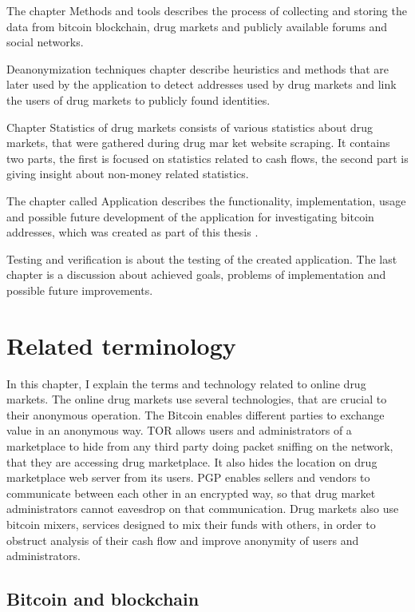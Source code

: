 \documentclass[
  digital, %
  table,   %
  lof,     %
  lot,     %
  oneside
]{fithesis3}
\begin{document}
The chapter Methods and tools describes the process of collecting and storing the data from bitcoin blockchain,
drug markets and publicly available forums and social networks. 

Deanonymization techniques chapter describe heuristics and methods that are later used by the application to detect 
addresses used by drug markets and link the users of drug markets to publicly found identities.

Chapter Statistics of drug markets consists of various statistics about drug markets, that were gathered during drug mar
ket website scraping.
It contains two parts, the first is focused on statistics related to cash flows, the second part is giving insight about
 non-money related statistics.

The chapter called Application describes the functionality, implementation, usage and 
possible future development of the application for investigating bitcoin addresses, which was created as part of this thesis
.

Testing and verification is about the testing of the created application.
The last chapter is a discussion about achieved goals, problems of implementation and possible future improvements.

\chapter{Related terminology}

In this chapter, I explain the terms and technology related to online drug markets.
The online drug markets use several technologies, that are crucial to their anonymous operation.
The Bitcoin enables different parties to exchange value in an anonymous way.
TOR allows users and administrators of a marketplace to hide from any third party doing packet sniffing on the network,
that they are accessing drug marketplace. It also hides the location on drug marketplace web server from its users.
PGP enables sellers and vendors to communicate between each other in an encrypted way,
so that drug market administrators cannot eavesdrop on that communication.
Drug markets also use bitcoin mixers, services designed to mix their funds with others, in order to obstruct
analysis of their cash flow and improve anonymity of users and administrators.

\section{Bitcoin and blockchain}
\end{document}
